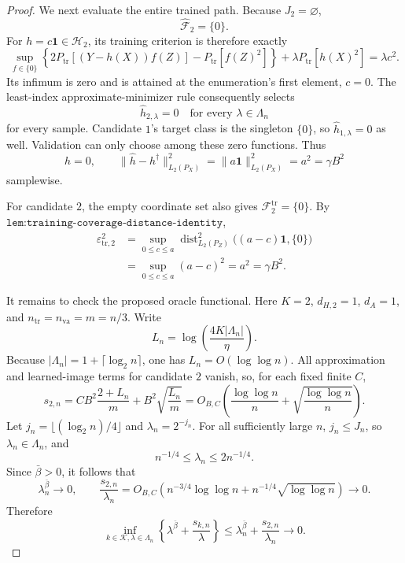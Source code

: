 \begin{proof}
We next evaluate the entire trained path. Because \(J_2=\varnothing\),
\[
 \widehat{\mathcal F}_2=\{0\}.
\]
For \(h=c\mathbf 1\in\mathcal H_2\), its training criterion is therefore exactly
\[
 \sup_{f\in\{0\}}
 \left\{2P_{\mathrm{tr}}[(Y-h(X))f(Z)]-P_{\mathrm{tr}}[f(Z)^2]\right\}
 +\lambda P_{\mathrm{tr}}[h(X)^2]
 =\lambda c^2.
\]
Its infimum is zero and is attained at the enumeration's first element, \(c=0\). The least-index approximate-minimizer rule consequently selects
\[
 \widehat h_{2,\lambda}=0
 \quad\text{for every }\lambda\in\Lambda_n
\]
for every sample. Candidate \(1\)'s target class is the singleton \(\{0\}\), so \(\widehat h_{1,\lambda}=0\) as well. Validation can only choose among these zero functions. Thus
\[
 \widehat h=0,
 \qquad
 \|\widehat h-h^\dagger\|_{L_2(P_X)}^2
 =\|a\mathbf 1\|_{L_2(P_X)}^2
 =a^2
 =\gamma B^2
\]
samplewise.

For candidate \(2\), the empty coordinate set also gives \(\mathcal F_2^{\mathrm{tr}}=\{0\}\). By \(\texttt{lem:training-coverage-distance-identity}\),
\[
 \begin{aligned}
 \varepsilon_{\mathrm{tr},2}^2
 &=\sup_{0\le c\le a}
   \operatorname{dist}_{L_2(P_Z)}^2
   \bigl((a-c)\mathbf 1,\{0\}\bigr)\\
 &=\sup_{0\le c\le a}(a-c)^2
 =a^2
 =\gamma B^2.
 \end{aligned}
\]

It remains to check the proposed oracle functional. Here \(K=2\), \(d_{H,2}=1\), \(d_A=1\), and \(n_{\mathrm{tr}}=n_{\mathrm{va}}=m=n/3\). Write
\[
 L_n=\log\!\left(\frac{4K|\Lambda_n|}{\eta}\right).
\]
Because \(|\Lambda_n|=1+\lceil\log_2 n\rceil\), one has \(L_n=O(\log\log n)\). All approximation and learned-image terms for candidate \(2\) vanish, so, for each fixed finite \(C\),
\[
 s_{2,n}
 =CB^2\frac{2+L_n}{m}
  +B^2\sqrt{\frac{L_n}{m}}
 =O_{B,C}\!\left(
   \frac{\log\log n}{n}
   +\sqrt{\frac{\log\log n}{n}}
  \right).
\]
Let \(j_n=\lfloor(\log_2 n)/4\rfloor\) and \(\lambda_n=2^{-j_n}\). For all sufficiently large \(n\), \(j_n\le J_n\), so \(\lambda_n\in\Lambda_n\), and
\[
 n^{-1/4}\le\lambda_n\le2n^{-1/4}.
\]
Since \(\bar\beta>0\), it follows that
\[
 \lambda_n^{\bar\beta}\longrightarrow0,
 \qquad
 \frac{s_{2,n}}{\lambda_n}
 =O_{B,C}\!\left(
   n^{-3/4}\log\log n
   +n^{-1/4}\sqrt{\log\log n}
  \right)
 \longrightarrow0.
\]
Therefore
\[
 \inf_{k\in\mathcal K,\lambda\in\Lambda_n}
 \left\{\lambda^{\bar\beta}+\frac{s_{k,n}}{\lambda}\right\}
 \le
 \lambda_n^{\bar\beta}+\frac{s_{2,n}}{\lambda_n}
 \longrightarrow0.
\]


\end{proof}
